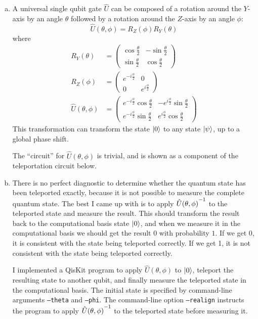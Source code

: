 \documentclass[12pt]{extarticle}
\begin{document}
\begin{enumerate}[(a)]
\item
A universal single qubit gate $\hat{U}$
can be composed of a rotation around the $Y$-axis by an angle $\theta$ followed by a rotation around the $Z$-axis by an angle $\phi$:
\[
\hat{U}(\theta,\phi) = R_Z(\phi)R_Y(\theta)
\]
where
\begin{align*}
R_Y(\theta) &= \begin{pmatrix}
    \cos\frac{\theta}{2} & -\sin\frac{\theta}{2} \\
    \sin\frac{\theta}{2} & \cos\frac{\theta}{2}
\end{pmatrix} \\
R_Z(\phi) &= \begin{pmatrix}
    e^{-i\frac{\phi}{2}} & 0 \\
    0 & e^{i\frac{\phi}{2}}
\end{pmatrix} \\
\hat{U}(\theta,\phi) &= \begin{pmatrix}
    e^{-i\frac{\phi}{2}}\cos\frac{\theta}{2} & -e^{i\frac{\phi}{2}}\sin\frac{\theta}{2} \\
    e^{-i\frac{\phi}{2}}\sin\frac{\theta}{2} & e^{i\frac{\phi}{2}}\cos\frac{\theta}{2}
\end{pmatrix}
\end{align*}
This transformation can transform the state $\ket{0}$ to any state $\ket{\psi}$, up to a global phase shift.

The ``circuit'' for $\hat{U}(\theta,\phi)$ is trivial, and is shown as a component of the teleportation circuit below.

\item
There is no perfect diagnostic to determine whether the quantum state has been teleported exactly,
because it is not possible to measure the complete quantum state.
The best I came up with is to apply ${{\hat{U}(\theta,\phi)}^{-1}}$ to the teleported state and measure the result.
This should transform the result back to the computational basis state $\ket{0}$,
and when we measure it in the computational basis we should get the result $0$ with probability $1$.
If we get 0, it is consistent with the state being teleported correctly.
If we get 1, it is not consistent with the state being teleported correctly.

I implemented a QisKit program to apply $\hat{U}(\theta,\phi)$ to $\ket{0}$,
teleport the resulting state to another qubit,
and finally measure the teleported state in the computational basis.
The initial state is specified by command-line arguments \texttt{---theta} and \texttt{---phi}.
The command-line option \texttt{---realign} instructs the program to apply ${{\hat{U}(\theta,\phi)}^{-1}}$ to the teleported state before measuring it.


\end{enumerate}
\end{document}
